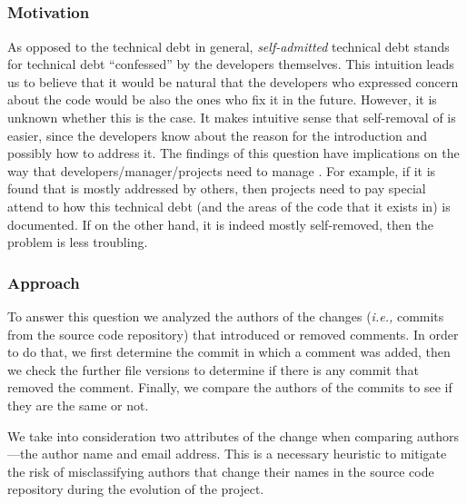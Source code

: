 \subsection*{\rqii}

\subsubsection*{Motivation} As opposed to the technical debt in general, \emph{self-admitted} technical debt stands for technical debt ``confessed'' by the developers themselves. This intuition leads us to believe that it would be natural that the developers who expressed concern about the code would be also the ones who fix it in the future. However, it is unknown whether this is the case. It makes intuitive sense that self-removal of \SATD is easier, since the developers know about the reason for the \SATD introduction and possibly how to address it. The findings of this question have implications on the way that developers/manager/projects need to manage \SATD. For example, if it is found that \SATD is mostly addressed by others, then projects need to pay special attend to how this technical debt (and the areas of the code that it exists in) is documented. If on the other hand, it is indeed mostly self-removed, then the problem is less troubling.




\subsubsection*{Approach} To answer this question we analyzed the authors of the changes (\textit{i.e.,} commits from the source code repository) that introduced or removed \SATD comments. In order to do that, we first determine the commit in which a \SATD comment was added, then we check the further file versions to determine if there is any commit that removed the \SATD comment. Finally, we compare the authors of the commits to see if they are the same or not. 

We take into consideration two attributes of the change when comparing authors---the author name and email address. This is a necessary heuristic to mitigate the risk of misclassifying authors that change their names in the source code repository during the evolution of the project.  


